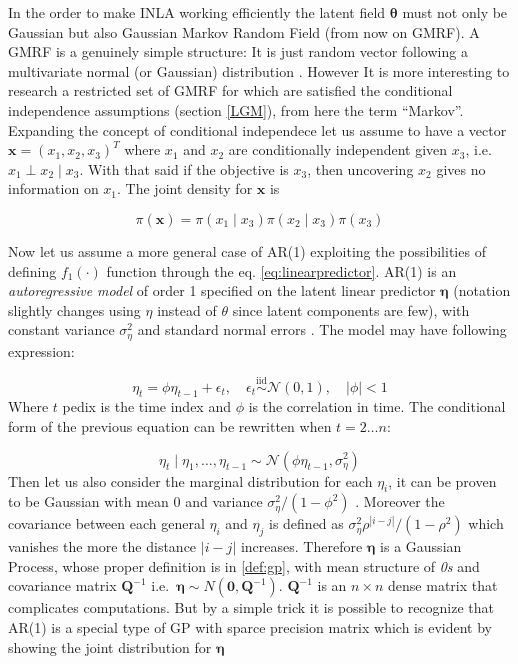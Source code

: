 \documentclass[
  12pt,
  a4paper,
  oneside]{book}
\theoremstyle{definition}
\theoremstyle{definition}
\theoremstyle{definition}
\theoremstyle{remark}
\begin{document}
In the order to make INLA working efficiently the latent field \(\boldsymbol\theta\) must not only be Gaussian but also Gaussian Markov Random Field (from now on GMRF). A GMRF is a genuinely simple structure: It is just random vector following a multivariate normal (or Gaussian) distribution \citep{GMRFRue}. However It is more interesting to research a restricted set of GMRF for which are satisfied the conditional independence assumptions (section \ref{LGM}), from here the term ``Markov''. Expanding the concept of conditional independece let us assume to have a vector \(\boldsymbol{\mathbf{x}}=\left(x_{1}, x_{2}, x_{3}\right)^{T}\) where \(x_1\) and \(x_2\) are conditionally independent given \(x_3\), i.e.~\(x_{1} \perp x_{2} \mid x_3\). With that said if the objective is \(x_3\), then uncovering \(x_2\) gives no information on \(x_1\). The joint density for \(\boldsymbol{\mathbf{x}}\) is

\begin{equation}
  \pi(\boldsymbol{\mathbf{x}})=\pi\left(x_{1} \mid x_{3}\right) \pi\left(x_{2} \mid x_{3}\right) \pi\left(x_{3}\right)
\label{eq:pix}
\end{equation}

Now let us assume a more general case of AR(1) exploiting the possibilities of defining \(f_{1}(\cdot)\) function through the eq. \eqref{eq:linearpredictor}. AR(1) is an \emph{autoregressive model} of order 1 specified on the latent linear predictor \(\boldsymbol\eta\) (notation slightly changes using \(\eta\) instead of \(\theta\) since latent components are few), with constant variance \(\sigma_{\eta}^{2}\) and standard normal errors \citetext{\citeyear{GMRFRue}; \citeyear{wang2018bayesian}}. The model may have following expression:

\[
\eta_t=\phi \eta_{t-1}+\epsilon_{t}, \quad \epsilon_{t} \stackrel{\mathrm{iid}}{\sim} \mathcal{N}(0,1), \quad|\phi|<1
\]
Where \(t\) pedix is the time index and \(\phi\) is the correlation in time. The conditional form of the previous equation can be rewritten when \(t = 2 \ldots n\):

\[
\eta_{t} \mid \eta_{1}, \ldots, \eta_{t-1} \sim \mathcal{N}\left(\phi \eta_{t-1}, \sigma_{\eta}^{2}\right)
\]
Then let us also consider the marginal distribution for each \(\eta_i\), it can be proven to be Gaussian with mean 0 and variance \(\sigma_{\eta}^{2} /\left(1-\phi^{2}\right)\) \citeyearpar{wang2018bayesian}. Moreover the covariance between each general \(\eta_{i}\) and \(\eta_{j}\) is defined as \(\sigma_{\eta}^{2} \rho^{|i-j|} /\left(1-\rho^{2}\right)\) which vanishes the more the distance \(|i-j|\) increases.
Therefore \(\boldsymbol\eta\) is a Gaussian Process, whose proper definition is in \ref{def:gp}, with mean structure of \emph{0s} and covariance matrix \(\boldsymbol{Q}^{-1}\) i.e.~\(\boldsymbol{\eta} \sim N(\mathbf{0}, \boldsymbol{Q}^{-1})\). \(\boldsymbol{Q}^{-1}\) is an \(n \times n\) dense matrix that complicates computations.
But by a simple trick it is possible to recognize that AR(1) is a special type of GP with sparce precision matrix which is evident by showing the joint distribution for \(\boldsymbol\eta\)
\end{document}
